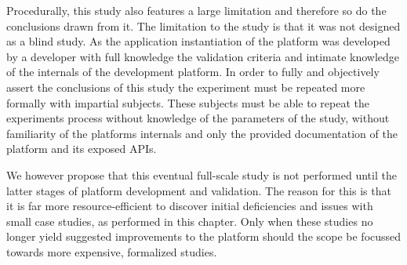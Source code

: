 Procedurally, this study also features a large limitation and therefore so do the conclusions drawn from it. The limitation to the study is that it was not designed as a blind study. As the application instantiation of the platform was developed by a developer with full knowledge the validation criteria and intimate knowledge of the internals of the development platform. In order to fully and objectively assert the conclusions of this study the experiment must be repeated more formally with impartial subjects. These subjects must be able to repeat the experiments process without knowledge of the parameters of the study, without familiarity of the platforms internals and only the provided documentation of the platform and its exposed APIs.

We however propose that this eventual full-scale study is not performed until the latter stages of platform development and validation. The reason for this is that it is far more resource-efficient to discover initial deficiencies and issues with small case studies, as performed in this chapter. Only when these studies no longer yield suggested improvements to the platform should the scope be focussed towards more expensive, formalized studies.